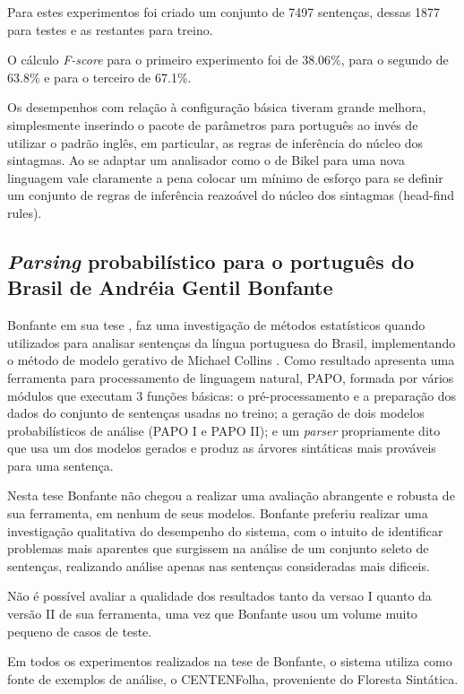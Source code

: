 Para estes experimentos foi criado um conjunto de 7497 sentenças, dessas 1877 para testes e as restantes para treino.

O cálculo \emph{F-score} para o primeiro experimento foi de 38.06{\%}, para o segundo de 63.8{\%} e para o terceiro de 67.1{\%}. 

Os desempenhos com relação à configuração básica tiveram grande melhora, simplesmente inserindo o pacote de parâmetros para português ao invés de utilizar o padrão inglês, em particular, as regras de inferência do núcleo dos sintagmas. Ao se adaptar um analisador como o de Bikel para uma nova linguagem vale claramente a pena colocar um mínimo de esforço para se definir um conjunto de regras de inferência reazoável do núcleo dos sintagmas (head-find rules).

\subsection{\emph{Parsing} probabilístico para o português do Brasil de Andréia Gentil Bonfante} %
\label{sec:bonfante}

Bonfante em sua tese \cite{bonfante03}, faz uma investigação de métodos estatísticos quando utilizados para analisar sentenças da língua portuguesa do Brasil, implementando o método de modelo gerativo de Michael Collins \cite{collins99}. Como resultado apresenta uma ferramenta para processamento de linguagem natural, PAPO, formada por vários módulos que executam 3 funções básicas: o pré-processamento e a preparação dos dados do conjunto de sentenças usadas no treino; a geração de dois modelos probabilísticos de análise (PAPO I e PAPO II); e um \emph{parser} propriamente dito que usa um dos modelos gerados e produz as árvores sintáticas mais prováveis para uma sentença.

Nesta tese Bonfante não chegou a realizar uma avaliação abrangente e robusta de sua ferramenta, em nenhum de seus modelos. Bonfante preferiu realizar uma investigação qualitativa do desempenho do sistema, com o intuito de identificar problemas mais aparentes que surgissem na análise de um conjunto seleto de sentenças, realizando análise apenas nas sentenças consideradas mais dificeis.

Não é possível avaliar a qualidade dos resultados tanto da versao I quanto da versão II de sua ferramenta, uma vez que Bonfante usou um volume muito pequeno de casos de teste.

Em todos os experimentos realizados na tese de Bonfante, o sistema utiliza como fonte de exemplos de análise, o CENTENFolha, proveniente do Floresta Sintática.

